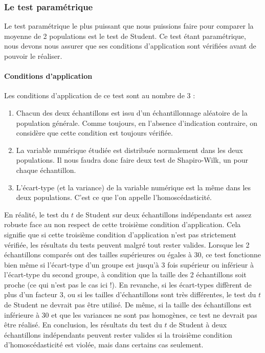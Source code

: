 \documentclass[
  a4paper,
]{article}
\providecommand{\tightlist}{%
  \setlength{\itemsep}{0pt}\setlength{\parskip}{0pt}}
\begin{document}
\hypertarget{le-test-paramuxe9trique-2}{%
\subsubsection{Le test paramétrique}\label{le-test-paramuxe9trique-2}}

Le test paramétrique le plus puissant que nous puissions faire pour comparer la moyenne de 2 populations est le test de Student. Ce test étant paramétrique, nous devons nous assurer que ses conditions d'application sont vérifiées avant de pouvoir le réaliser.

\hypertarget{conditions-dapplication-2}{%
\paragraph{Conditions d'application}\label{conditions-dapplication-2}}

Les conditions d'application de ce test sont au nombre de 3 :

\begin{enumerate}
\def\labelenumi{\arabic{enumi}.}
\tightlist
\item
  Chacun des deux échantillons est issu d'un échantillonnage aléatoire de la population générale. Comme toujours, en l'absence d'indication contraire, on considère que cette condition est toujours vérifiée.
\item
  La variable numérique étudiée est distribuée normalement dans les deux populations. Il nous faudra donc faire deux test de Shapiro-Wilk, un pour chaque échantillon.
\item
  L'écart-type (et la variance) de la variable numérique est la même dans les deux populations. C'est ce que l'on appelle l'homoscédasticité.
\end{enumerate}

En réalité, le test du \(t\) de Student sur deux échantillons indépendants est assez robuste face au non respect de cette troisième condition d'application. Cela signifie que si cette troisième condition d'application n'est pas strictement vérifiée, les résultats du tests peuvent malgré tout rester valides. Lorsque les 2 échantillons comparés ont des tailles supérieures ou égales à 30, ce test fonctionne bien même si l'écart-type d'un groupe est jusqu'à 3 fois supérieur ou inférieur à l'écart-type du second groupe, à condition que la taille des 2 échantillons soit proche (ce qui n'est pas le cas ici !). En revanche, si les écart-types diffèrent de plus d'un facteur 3, ou si les tailles d'échantillons sont très différentes, le test du \(t\) de Student ne devrait pas être utilisé. De même, si la taille des échantillons est inférieure à 30 et que les variances ne sont pas homogènes, ce test ne devrait pas être réalisé. En conclusion, les résultats du test du \(t\) de Student à deux échantillons indépendants peuvent rester valides si la troisième condition d'homoscédasticité est violée, mais dans certains cas seulement.
\end{document}
